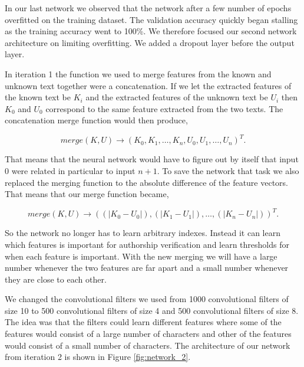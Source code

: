 In our last network we observed that the network after a few number of epochs
overfitted on the training dataset. The validation accuracy quickly began
stalling as the training accuracy went to 100\%. We therefore focused our second
network architecture on limiting overfitting. We added a dropout layer before
the output layer.

In iteration 1 the function we used to merge features from the known and unknown
text together were a concatenation. If we let the extracted features of the
known text be $K_i$ and the extracted features of the unknown text be $U_i$ then
$K_0$ and $U_0$ correspond to the same feature extracted from the two texts. The
concatenation merge function would then produce,

\begin{equation} merge(K, U) \rightarrow \left(
        K_0, K_1, \dots, K_n, U_0, U_1, \dots, U_n
    \right)^T.
\end{equation}

That means that the neural network would have to figure out by itself that input
$0$ were related in particular to input $n + 1$. To save the network that task
we also replaced the merging function to the absolute difference of the feature
vectors. That means that our merge function became,

\begin{equation}
    merge(K, U) \rightarrow \left(
        (|K_0 - U_0|), (|K_1 - U_1|), \dots, (|K_n - U_n|)
    \right)^T.
\end{equation}

So the network no longer has to learn arbitrary indexes. Instead it can learn
which features is important for authorship verification and learn thresholds for
when each feature is important. With the new merging we will have a large number
whenever the two features are far apart and a small number whenever they are
close to each other.

We changed the convolutional filters we used from 1000 convolutional filters of
size 10 to 500 convolutional filters of size 4 and 500 convolutional filters of
size 8. The idea was that the filters could learn different features where some
of the features would consist of a large number of characters and other of the
features would consist of a small number of characters. The architecture of our
network from iteration 2 is shown in Figure \ref{fig:network_2}.


